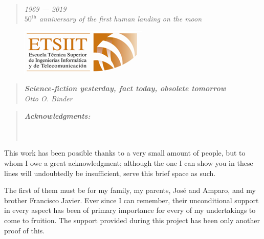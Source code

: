 \textbf{\emph{\large }}\\
\vspace{4cm}

\begin{quotation}
\centering
\textit{{\emph{1969 --- 2019}}}\\
\textit{{\emph{$50^{\text{th}}$ anniversary of the first human landing on the moon}}}

\end{quotation}
\begin{figure}[H]
	\centering
		\includegraphics[scale=0.55]{imagenes/etsiit_logo.png}
	\label{fig:vostok1}
\end{figure}

\begin{quotation}
\centering
\textbf{\emph{Science-fiction yesterday, fact today, obsolete tomorrow}}\\
\textit{{\emph{Otto O. Binder}}}\\

\end{quotation}

\afterpage{\blankpage}


\clearpage
{}
{}


\begin{quotation}
\noindent \begin{center}
\textbf{\emph{\Large Acknowledgments:}}\textbf{\emph{\large }}\\
\textbf{\emph{\large }}\\
\textbf{\emph{\large }}\\
\textbf{\emph{\large }}
\par\end{center}{\large \par}
\end{quotation}

This work has been possible thanks to a very small amount of people, but to whom I owe a great acknowledgment; although the one I can show you in these lines will undoubtedly be insufficient, serve this brief space as such.

The first of them must be for my family, my parents, José and Amparo, and my brother Francisco Javier. Ever since I can remember, their unconditional support in every aspect has been of primary importance for every of my undertakings to come to fruition. The support provided during this project has been only another proof of this.

